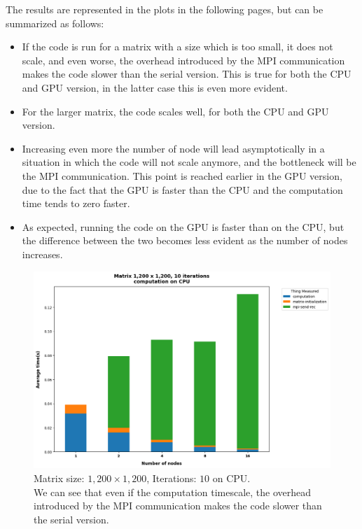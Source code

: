 \documentclass{article}
\begin{document}
    The results are represented in the plots in the following pages, but can be summarized as follows:

    \begin{itemize}
        \itemsep0em
        \item If the code is run for a matrix with a size which is too small, it does not scale, and even worse, the overhead introduced by the MPI communication
            makes the code slower than the serial version.
            This is true for both the CPU and GPU version, in the latter case this is even more evident.
        \item For the larger matrix, the code scales well, for both the CPU and GPU version.
        \item Increasing even more the number of node will lead asymptotically in a situation in which the code will
            not scale anymore, and the bottleneck will be the MPI communication.
            This point is reached earlier in the GPU version, due to the fact that the GPU is faster than the CPU and the computation time tends to zero faster.
        \item As expected, running the code on the GPU is faster than on the CPU, but the difference between the two becomes less evident as the number of nodes increases.
    \end{itemize}

    \newpage

    \begin{figure}
        \includegraphics[width=\textwidth]{./plots/plt00}
        \caption{Matrix size: $1,200 \times 1,200$, Iterations: $10$ on CPU.\\ We can see that even if the computation timescale, the overhead introduced by the MPI communication makes the code slower than the serial version.}
        \label{fig:figure0}
    \end{figure}
\end{document}
